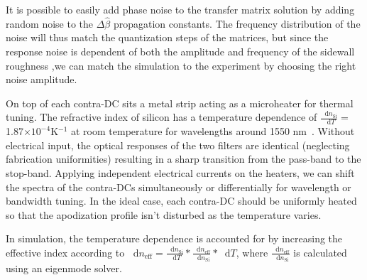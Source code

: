 \documentclass[osajnl,twocolumn,showpacs,superscriptaddress,10pt]{revtex4-1}
\newcommand*\diff{\mathop{}\!\mathrm{d}}
\begin{document}
It is possible to easily add phase noise to the transfer matrix solution by adding random noise to the $\Delta\hat{\beta}$ propagation constants. The frequency distribution of the noise will thus match the quantization steps of the matrices, but since the response noise is dependent of both the amplitude and frequency of the sidewall roughness \cite{simard2011impact},we can match the simulation to the experiment by choosing the right noise amplitude.


On top of each contra-DC sits a metal strip acting as a microheater for thermal tuning.  
The refractive index of silicon has a temperature dependence of $\frac{\diff{n_\text{Si}}}{\diff{T}}=$ 1.87$\times10^{-4}$K$^{-1}$ at room temperature for wavelengths around 1550 nm~\cite{frey2006temperature}.
Without electrical input, the optical responses of the two filters are identical (neglecting fabrication uniformities) resulting in a sharp transition from the pass-band to the stop-band. 
Applying independent electrical currents on the heaters, we can shift the spectra of the contra-DCs simultaneously or differentially for wavelength or bandwidth tuning.
In the ideal case, each contra-DC should be uniformly heated so that the apodization profile isn't disturbed as the temperature varies.

In simulation, the temperature dependence is accounted for by increasing the effective index according to 
$\diff{n_\text{eff}}=\frac{\diff{n_\text{Si}}}{\diff{T}}*\frac{\diff{n_\text{eff}}}{\diff{n_\text{Si}}}*\diff{T}$, where $\frac{\diff{n_\text{eff}}}{\diff{n_\text{Si}}}$ is calculated using an eigenmode solver.




\end{document}
